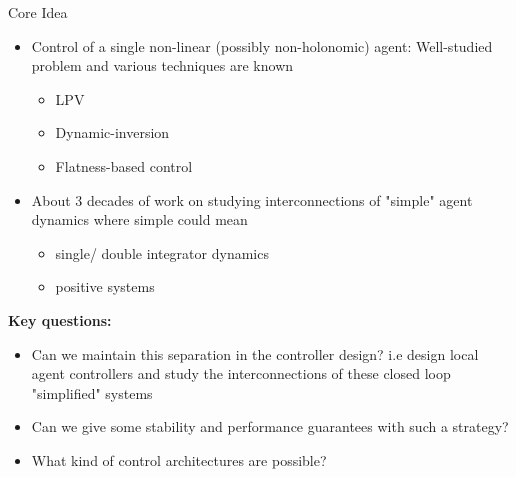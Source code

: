 \begin{frame}{Core Idea}	
	\begin{itemize}
		\item Control of a single non-linear (possibly non-holonomic) agent: Well-studied problem and various techniques are known
		\begin{itemize}
			\item LPV
			\item Dynamic-inversion
			\item Flatness-based control
		\end{itemize}		
		\item About 3 decades of work on studying interconnections of "simple" agent dynamics where simple could mean
		\begin{itemize}
			\item single/ double integrator dynamics
			\item positive systems 
		\end{itemize} 
	\end{itemize}
\pause
\textbf{Key questions:}
\begin{itemize}
	\item Can we maintain this separation in the controller design? i.e design local agent controllers and study the interconnections of these closed loop "simplified" systems
	\item Can we give some stability and performance guarantees with such a strategy?
	\item What kind of control architectures are possible?
	\end{itemize}
\end{frame}
